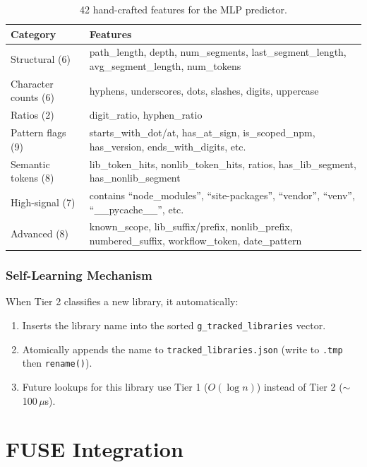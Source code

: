 \documentclass[12pt, a4paper]{article}
\begin{document}
\begin{table}[H]
\centering
\small
\begin{tabular}{lp{8cm}}
\toprule
\textbf{Category} & \textbf{Features} \\
\midrule
Structural (6) & path\_length, depth, num\_segments, last\_segment\_length, avg\_segment\_length, num\_tokens \\
Character counts (6) & hyphens, underscores, dots, slashes, digits, uppercase \\
Ratios (2) & digit\_ratio, hyphen\_ratio \\
Pattern flags (9) & starts\_with\_dot/at, has\_at\_sign, is\_scoped\_npm, has\_version, ends\_with\_digits, etc. \\
Semantic tokens (8) & lib\_token\_hits, nonlib\_token\_hits, ratios, has\_lib\_segment, has\_nonlib\_segment \\
High-signal (7) & contains ``node\_modules'', ``site-packages'', ``vendor'', ``venv'', ``\_\_pycache\_\_'', etc. \\
Advanced (8) & known\_scope, lib\_suffix/prefix, nonlib\_prefix, numbered\_suffix, workflow\_token, date\_pattern \\
\bottomrule
\end{tabular}
\caption{42 hand-crafted features for the MLP predictor.}
\end{table}

\subsubsection{Self-Learning Mechanism}

When Tier 2 classifies a new library, it automatically:
\begin{enumerate}
  \item Inserts the library name into the sorted \texttt{g\_tracked\_libraries} vector.
  \item Atomically appends the name to \texttt{tracked\_libraries.json} (write to \texttt{.tmp} then \texttt{rename()}).
  \item Future lookups for this library use Tier 1 ($O(\log n)$) instead of Tier 2 ($\sim$100\,$\mu$s).
\end{enumerate}

\section{FUSE Integration}
\end{document}
